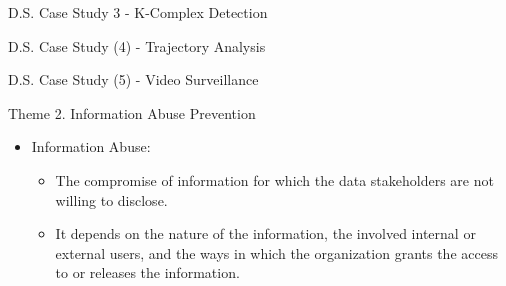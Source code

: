 \documentclass[
 size=14pt,
 paper=smartboard,  %
 mode=present, 		%
 display=slides, 	%
 style=tuliplab,  	%
 pauseslide,
 fleqn,leqno]{powerdot}
\begin{document}
\begin{slide}[toc=,bm=]{D.S. Case Study 3 - K-Complex Detection}


\end{slide}


\begin{slide}[toc=,bm=]{D.S. Case Study (4) - Trajectory Analysis}


\end{slide}


\begin{slide}[toc=,bm=]{D.S. Case Study (5) - Video Surveillance}
\begin{figure}[ht]
\end{figure}

\end{slide}

\begin{slide}{Theme 2. Information Abuse Prevention}
\begin{itemize}
\item
Information Abuse:


\begin{itemize}
\item
The compromise of information
for which the data stakeholders are not willing to disclose.


\item
It depends on the nature of the information,
the involved internal or external users,
and the ways in which the organization grants the access to
or releases the information.

\end{itemize}
\end{itemize}

\end{slide}
\end{document}
